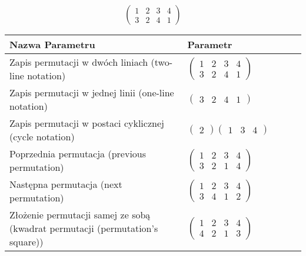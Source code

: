 \documentclass[12pt]{article}
\begin{document}
\subsection{}
\begin{center}
\[
\begin{pmatrix}
	1 & 2 & 3 & 4 \\ 
	3 & 2 & 4 & 1 
\end{pmatrix}
\]

\begin{tabular}{|m{0.6\linewidth}|m{0.4\linewidth}|}
	\hline
	Nazwa Parametru & Parametr \\
	\hline
	Zapis permutacji w dwóch liniach (two-line notation) & $\begin{pmatrix} 1 & 2 & 3 & 4 \\ 
3 & 2 & 4 & 1 \end{pmatrix}$ \\ 
	\hline
	Zapis permutacji w jednej linii (one-line notation) & $\begin{pmatrix} 3 & 2 & 4 & 1 \end{pmatrix}$ \\ 
	\hline
	Zapis permutacji w postaci cyklicznej (cycle notation) & $\begin{pmatrix} 2 \end{pmatrix} \begin{pmatrix} 1 & 3 & 4 \end{pmatrix} $ \\ 
	\hline
	Poprzednia permutacja (previous permutation) & $\begin{pmatrix} 1 & 2 & 3 & 4 \\ 
3 & 2 & 1 & 4 \end{pmatrix}$ \\ 
	\hline
	Następna permutacja (next permutation) & $\begin{pmatrix} 1 & 2 & 3 & 4 \\ 
3 & 4 & 1 & 2 \end{pmatrix}$ \\ 
	\hline
	Złożenie permutacji samej ze sobą (kwadrat permutacji (permutation's square)) & $\begin{pmatrix} 1 & 2 & 3 & 4 \\ 
4 & 2 & 1 & 3 \end{pmatrix}$ \\ 
	\hline
\end{tabular}
\end{center}
\end{document}

